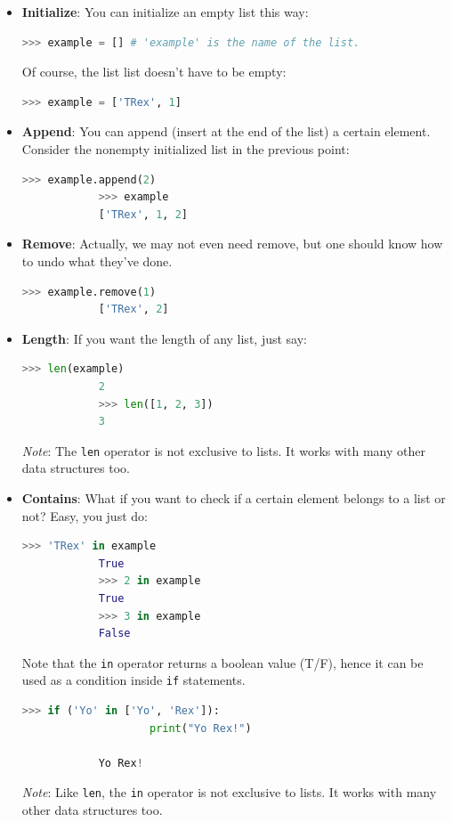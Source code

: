 \documentclass{article}
\begin{document}
\begin{itemize}
    \item \textbf{Initialize}: You can initialize an empty list this    way: 
        \begin{lstlisting}[language=Python]
            >>> example = [] # 'example' is the name of the list.
        \end{lstlisting}
        Of course, the list list doesn't have to be empty:
        \begin{lstlisting}[language=Python]
            >>> example = ['TRex', 1]
        \end{lstlisting}
    \item \textbf{Append}: You can append (insert at the end of the     list) a certain element. Consider the nonempty initialized list in the previous point:     
        \begin{lstlisting}[language=Python]
            >>> example.append(2)
            >>> example 
            ['TRex', 1, 2]
        \end{lstlisting}
    \item \textbf{Remove}: Actually, we may not even need remove, but   one should know how to undo what they've done.
        \begin{lstlisting}[language=Python]
            >>> example.remove(1)
            ['TRex', 2]
        \end{lstlisting}
    \item \textbf{Length}: If you want the length of any list, just say:
        \begin{lstlisting}[language=Python]
            >>> len(example)
            2
            >>> len([1, 2, 3])
            3
        \end{lstlisting}
    \textit{Note}: The \texttt{len} operator is not exclusive to lists. It works with many other data structures too. 
    \item \textbf{Contains}: What if you want to check if a certain         element belongs to a list or not? Easy, you just do:
        \begin{lstlisting}[language=Python]
            >>> 'TRex' in example
            True
            >>> 2 in example
            True
            >>> 3 in example
            False
        \end{lstlisting}
    Note that the \texttt{in} operator returns a boolean value (T/F), hence it can be used as a condition inside \texttt{if} statements.
        \begin{lstlisting}[language=Python]
            >>> if ('Yo' in ['Yo', 'Rex']):
                    print("Yo Rex!")
                
            Yo Rex!
        \end{lstlisting}
    \textit{Note}: Like \texttt{len}, the \texttt{in} operator is not exclusive to lists. It works with many other data structures too. 
\end{itemize}
\end{document}
